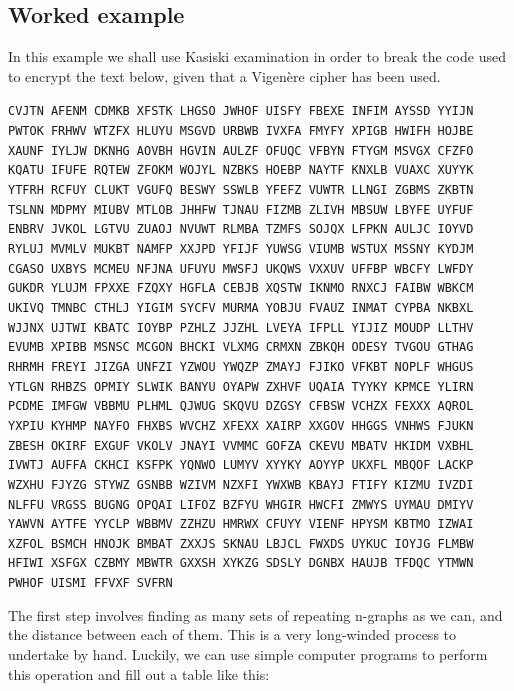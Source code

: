 \documentclass[Lau,binding=0.6cm,oneside]{sapthesis}
\begin{document}
\subsection{Worked example}
In this example we shall use Kasiski examination in order to break the code used to encrypt the text below, given that a Vigenère cipher has been used.

\begin{displayquote}{\small{\texttt{CVJTN AFENM CDMKB XFSTK LHGSO JWHOF UISFY FBEXE INFIM AYSSD YYIJN PWTOK FRHWV WTZFX HLUYU MSGVD URBWB IVXFA FMYFY XPIGB HWIFH HOJBE XAUNF IYLJW DKNHG AOVBH HGVIN AULZF OFUQC VFBYN FTYGM MSVGX CFZFO KQATU IFUFE RQTEW ZFOKM WOJYL NZBKS HOEBP NAYTF KNXLB VUAXC XUYYK YTFRH RCFUY CLUKT VGUFQ BESWY SSWLB YFEFZ VUWTR LLNGI ZGBMS ZKBTN TSLNN MDPMY MIUBV MTLOB JHHFW TJNAU FIZMB ZLIVH MBSUW LBYFE UYFUF ENBRV JVKOL LGTVU ZUAOJ NVUWT RLMBA TZMFS SOJQX LFPKN AULJC IOYVD RYLUJ MVMLV MUKBT NAMFP XXJPD YFIJF YUWSG VIUMB WSTUX MSSNY KYDJM CGASO UXBYS MCMEU NFJNA UFUYU MWSFJ UKQWS VXXUV UFFBP WBCFY LWFDY GUKDR YLUJM FPXXE FZQXY HGFLA CEBJB XQSTW IKNMO RNXCJ FAIBW WBKCM UKIVQ TMNBC CTHLJ YIGIM SYCFV MURMA YOBJU FVAUZ INMAT CYPBA NKBXL WJJNX UJTWI KBATC IOYBP PZHLZ JJZHL LVEYA IFPLL YIJIZ MOUDP LLTHV EVUMB XPIBB MSNSC MCGON BHCKI VLXMG CRMXN ZBKQH ODESY TVGOU GTHAG RHRMH FREYI JIZGA UNFZI YZWOU YWQZP ZMAYJ FJIKO VFKBT NOPLF WHGUS YTLGN RHBZS OPMIY SLWIK BANYU OYAPW ZXHVF UQAIA TYYKY KPMCE YLIRN PCDME IMFGW VBBMU PLHML QJWUG SKQVU DZGSY CFBSW VCHZX FEXXX AQROL YXPIU KYHMP NAYFO FHXBS WVCHZ XFEXX XAIRP XXGOV HHGGS VNHWS FJUKN ZBESH OKIRF EXGUF VKOLV JNAYI VVMMC GOFZA CKEVU MBATV HKIDM VXBHL IVWTJ AUFFA CKHCI KSFPK YQNWO LUMYV XYYKY AOYYP UKXFL MBQOF LACKP WZXHU FJYZG STYWZ GSNBB WZIVM NZXFI YWXWB KBAYJ FTIFY KIZMU IVZDI NLFFU VRGSS BUGNG OPQAI LIFOZ BZFYU WHGIR HWCFI ZMWYS UYMAU DMIYV YAWVN AYTFE YYCLP WBBMV ZZHZU HMRWX CFUYY VIENF HPYSM KBTMO IZWAI XZFOL BSMCH HNOJK BMBAT ZXXJS SKNAU LBJCL FWXDS UYKUC IOYJG FLMBW HFIWI XSFGX CZBMY MBWTR GXXSH XYKZG SDSLY DGNBX HAUJB TFDQC YTMWN PWHOF UISMI FFVXF SVFRN}}}
\end{displayquote}

The first step involves finding as many sets of repeating n-graphs as we can, and the distance between each of them. This is a very long-winded process to undertake by hand. Luckily, we can use simple computer programs to perform this operation and fill out a table like this:
\end{document}
